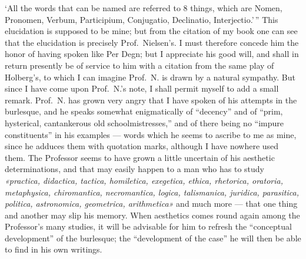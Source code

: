 \documentclass[12pt,a4paper]{book}
\begin{document}
`All the words that can be named are referred to 8 things, which are Nomen,
Pronomen, Verbum, Participium, Conjugatio, Declinatio, Interjectio.'\,''
This elucidation is supposed to be mine; but from the citation of my book one can
see that the elucidation is precisely Prof.\ Nielsen's. I must therefore concede
him the honor of having spoken like Per Degn; but I appreciate his good will, and
shall in return presently be of service to him with a citation from the same play
of Holberg's, to which I can imagine Prof.\ N. is drawn by a natural sympathy.
But since I have come upon Prof.\ N.'s note, I shall permit myself to add a small
remark. Prof.\ N. has grown very angry that I have spoken of his attempts in the
burlesque, and he speaks somewhat enigmatically of ``decency'' and of ``prim,
hysterical, cantankerous old schoolmistresses,'' and of there being no ``impure
constituents'' in his examples --- words which he seems to ascribe to me as mine,
since he adduces them with quotation marks, although I have nowhere used them.
The Professor seems
to have grown a little uncertain of his aesthetic determinations, and that may
easily happen to a man who has to study \textit{«practica, didactica, tactica,
homiletica, exegetica, ethica, rhetorica, oratoria, metaphysica, chiromantica,
necromantica, logica, talismanica, juridica, parasitica, politica, astronomica,
geometrica, arithmetica»} and much more --- that one thing and another may slip
his memory.
When aesthetics comes round again among the Professor's many studies, it will be
advisable for him to refresh the ``conceptual development'' of the burlesque; the
``development of the case'' he will then be able to find in his own writings.
\end{document}
